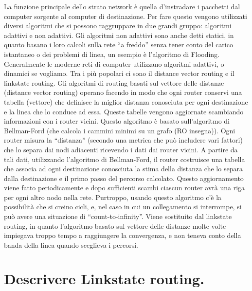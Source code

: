 La funzione principale dello strato network è quella d’instradare i pacchetti dal computer sorgente al computer di destinazione. Per fare questo vengono utilizzati diversi algoritmi che si possono raggruppare in due grandi gruppo: algoritmi adattivi e non adattivi. Gli algoritmi non adattivi sono anche detti statici, in quanto basano i loro calcoli sulla rete “a freddo” senza tener conto del carico istantaneo o dei problemi di linea, un esempio è l’algoritmo di Flooding.
Generalmente le moderne reti di computer utilizzano algoritmi adattivi, o dinamici se vogliamo. Tra i più popolari ci sono il distance vector routing e il linkstate routing.
Gli algoritmi di routing basati sul vettore delle distanze (distance vector routing) operano facendo in modo che ogni router conservi una tabella (vettore) che definisce la miglior distanza conosciuta per ogni destinazione e la linea che lo conduce ad essa. Queste tabelle vengono aggiornate scambiando informazioni con i router vicini.
Questo algoritmo è basato sull’algoritmo di Bellman-Ford (che calcola i cammini minimi su un grafo (RO insegna)).
Ogni router misura la “distanza” (secondo una metrica che può includere vari fattori) che lo separa dai nodi adiacenti ricevendo i dati dai router vicini. A partire da tali dati, utilizzando l’algoritmo di Bellman-Ford, il router costruisce una tabella che associa ad ogni destinazione conosciuta la stima della distanza che lo separa dalla destinazione e il primo passo del percorso calcolato.
Questo aggiornamento viene fatto periodicamente e dopo sufficienti scambi ciascun router avrà una riga per ogni altro nodo nella rete.
Purtroppo, usando questo algoritmo c’è la possibilità che si creino cicli, e, nel caso in cui un collegamento si interrompe, si può avere una situazione di “count-to-infinity”.
Viene sostituito dal linkstate routing, in quanto l’algoritmo basato sul vettore delle distanze molte volte impiegava troppo tempo a raggiungere la convergenza, e non teneva conto della banda della linea quando sceglieva i percorsi.

 

\section{Descrivere Linkstate routing.}

